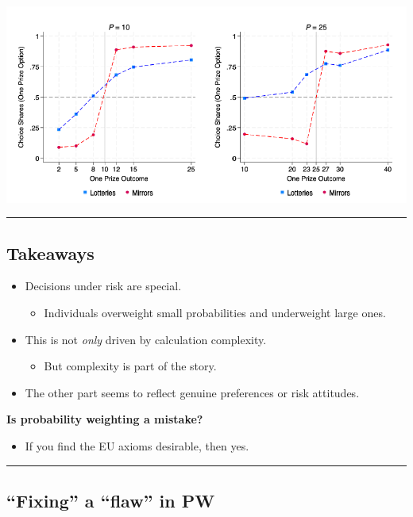 \documentclass[
  letterpaper,
  DIV=11,
  numbers=noendperiod]{scrartcl}
\providecommand{\tightlist}{%
  \setlength{\itemsep}{0pt}\setlength{\parskip}{0pt}}\usepackage{longtable,booktabs,array}
\begin{document}
\includegraphics[width=0.6\linewidth,height=\textheight,keepaspectratio]{figures/SimplicityEquivalentsWu.png}

\begin{center}\rule{0.5\linewidth}{0.5pt}\end{center}

\subsection{Takeaways}\label{takeaways}

\begin{itemize}
\tightlist
\item
  Decisions under risk are special.

  \begin{itemize}
  \tightlist
  \item
    Individuals overweight small probabilities and underweight large
    ones.
  \end{itemize}
\item
  This is not \emph{only} driven by calculation complexity.

  \begin{itemize}
  \tightlist
  \item
    But complexity is part of the story.
  \end{itemize}
\item
  The other part seems to reflect genuine preferences or risk attitudes.
\end{itemize}

{\textbf{Is probability weighting a mistake?}}

\begin{itemize}
\tightlist
\item
  If you find the EU axioms desirable, then yes.
\end{itemize}

\begin{center}\rule{0.5\linewidth}{0.5pt}\end{center}

\subsection{``Fixing'' a ``flaw'' in PW}\label{fixing-a-flaw-in-pw}
\end{document}

